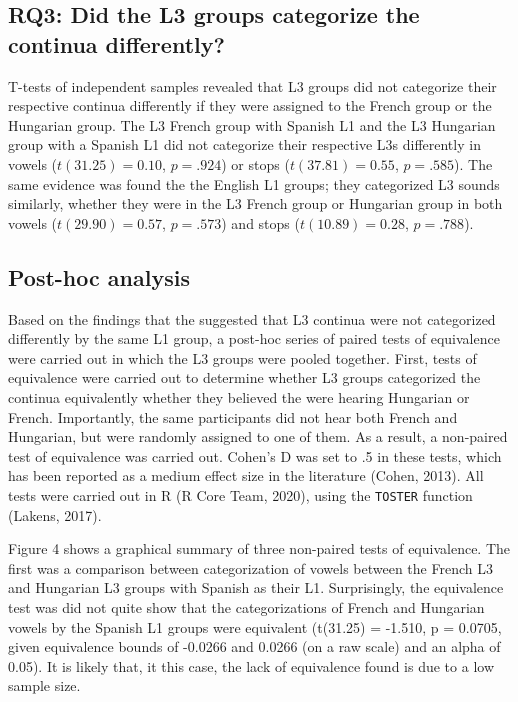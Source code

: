 \documentclass[
  english,
  man]{apa6}
\begin{document}
\hypertarget{rq3-did-the-l3-groups-categorize-the-continua-differently}{%
\subsection{RQ3: Did the L3 groups categorize the continua differently?}\label{rq3-did-the-l3-groups-categorize-the-continua-differently}}

T-tests of independent samples revealed that L3 groups did not categorize their respective continua differently if they were assigned to the French group or the Hungarian group. The L3 French group with Spanish L1 and the L3 Hungarian group with a Spanish L1 did not categorize their respective L3s differently in vowels (\(t(31.25) = 0.10\), \(p = .924\)) or stops (\(t(37.81) = 0.55\), \(p = .585\)). The same evidence was found the the English L1 groups; they categorized L3 sounds similarly, whether they were in the L3 French group or Hungarian group in both vowels (\(t(29.90) = 0.57\), \(p = .573\)) and stops (\(t(10.89) = 0.28\), \(p = .788\)).

\hypertarget{post-hoc-analysis}{%
\subsection{Post-hoc analysis}\label{post-hoc-analysis}}

Based on the findings that the suggested that L3 continua were not categorized differently by the same L1 group, a post-hoc series of paired tests of equivalence were carried out in which the L3 groups were pooled together.
First, tests of equivalence were carried out to determine whether L3 groups categorized the continua equivalently whether they believed the were hearing Hungarian or French.
Importantly, the same participants did not hear both French and Hungarian, but were randomly assigned to one of them. As a result, a non-paired test of equivalence was carried out. Cohen's D was set to .5 in these tests, which has been reported as a medium effect size in the literature (Cohen, 2013).
All tests were carried out in R (R Core Team, 2020), using the \texttt{TOSTER} function (Lakens, 2017).

Figure 4 shows a graphical summary of three non-paired tests of equivalence. The first was a comparison between categorization of vowels between the French L3 and Hungarian L3 groups with Spanish as their L1. Surprisingly, the equivalence test was did not quite show that the categorizations of French and Hungarian vowels by the Spanish L1 groups were equivalent (t(31.25) = -1.510, p = 0.0705, given equivalence bounds of -0.0266 and 0.0266 (on a raw scale) and an alpha of 0.05).
It is likely that, it this case, the lack of equivalence found is due to a low sample size.
\end{document}
